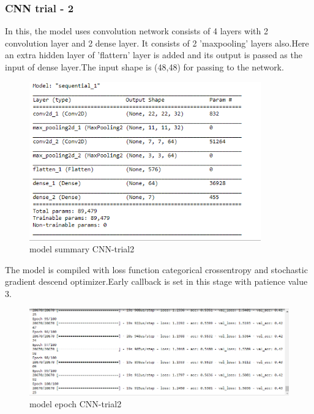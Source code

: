  \subsubsection{CNN trial - 2 }
 In this, the model uses convolution network consists of 4 layers with 2 convolution layer and 2 dense layer. It consists of 2 'maxpooling' layers also.Here an extra hidden layer of 'flattern' layer is added and its output is passed as the input of dense layer.The input shape is (48,48) for passing to the network.
\begin{figure}[h]
\label{ss}
\centering
\includegraphics[width= 10cm]{cnn_trial2sum.PNG}
\caption{model summary CNN-trial2}
\end{figure} 
The model is compiled with loss function categorical crossentropy and stochastic gradient descend optimizer.Early callback is set in this stage with patience value 3.
\begin{figure}[h]
\label{ss}
\centering
\includegraphics[width= 12cm]{cnn_trial2epoch.PNG}
\caption{model epoch CNN-trial2}
\end{figure}


